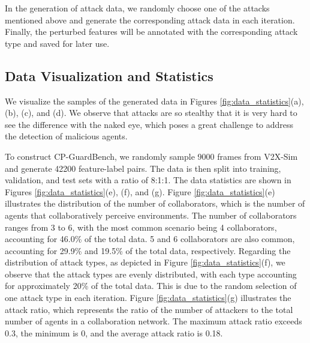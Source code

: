 In the generation of attack data, we randomly choose one of the attacks mentioned above and generate the corresponding attack data in each iteration.
Finally, the perturbed features will be annotated with the corresponding attack type and saved for later use. 
\vspace{-3mm}




\subsection{Data Visualization and Statistics}
\label{sec:data_statistics}





We visualize the samples of the generated data in Figures \ref{fig:data_statistics}(a), (b), (c), and (d). We observe that attacks are so stealthy that it is very hard to see the difference with the naked eye, which poses a great challenge to address the detection of malicious agents.



To construct CP-GuardBench, we randomly sample 9000 frames from V2X-Sim and generate 42200 feature-label pairs. The data is then split into training, validation, and test sets with a ratio of 8:1:1. 
The data statistics are shown in Figures \ref{fig:data_statistics}(e), (f), and (g). Figure \ref{fig:data_statistics}(e) illustrates the distribution of the number of collaborators, which is the number of agents that collaboratively perceive environments. 
The number of collaborators ranges from 3 to 6, with the most common scenario being 4 collaborators, accounting for 46.0\% of the total data. 5 and 6 collaborators are also common, accounting for 29.9\% and 19.5\% of the total data, respectively. 
Regarding the distribution of attack types, as depicted in Figure \ref{fig:data_statistics}(f), we observe that the attack types are evenly distributed, with each type accounting for approximately 20\% of the total data. This is due to the random selection of one attack type in each iteration. Figure \ref{fig:data_statistics}(g) illustrates the attack ratio, which represents the ratio of the number of attackers to the total number of agents in a collaboration network. The maximum attack ratio exceeds 0.3, the minimum is 0, and the average attack ratio is 0.18.


